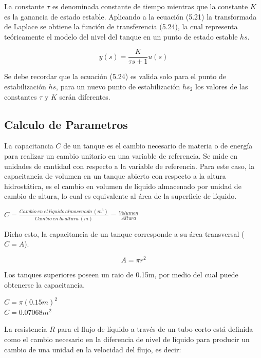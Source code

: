 \documentclass[a4paper,12pt,twoside]{proyectotanquesecci}
\begin{document}
La constante $\tau$ es denominada constante de tiempo mientras que la constante $K$ es la ganancia de estado estable. Aplicando a la ecuación (5.21) la transformada de Laplace se obtiene la función de transferencia (5.24), la cual representa teóricamente el modelo del nivel del tanque en un punto de estado estable $hs$.

\begin{equation}
y(s)=\frac{K}{\tau s+1}u(s)
\end{equation}

Se debe recordar que la ecuación (5.24) es valida solo para el punto de estabilización $hs$, para un nuevo punto de estabilización $hs_{2}$ los valores de las constantes $\tau$ y $K$ serán diferentes. \\




\subsection{Calculo de Parametros}

La capacitancia $C$ de un tanque es el cambio necesario de materia o de energía para realizar un cambio unitario en una variable de referencia. Se mide en unidades de cantidad con respecto a la variable de referencia. Para este caso, la capacitancia de volumen en un tanque abierto con respecto a la altura hidrostática, es el cambio en volumen de líquido almacenado por unidad de cambio de altura, lo cual es equivalente al área de la superficie de líquido.

\begin{center}
$C=\frac{Cambio\ en\ el\ liquido\ almacenado\ (m^{3})}{Cambio\ en\ la\ altura\ (m)}=\frac{Volumen}{Altura}$
\end{center}

Dicho esto, la capacitancia de un tanque corresponde a su área transversal ($C=A$).

\begin{equation}
A=\pi r^{2}
\end{equation}

Los tanques superiores poseen un raio de 0.15m, por medio del cual puede obtenerse la capacitancia.

\begin{center}
$C=\pi (0.15m)^{2}$ \\
$C=0.07068 m^{2}$
\end{center}

La resistencia $R$ para el flujo de líquido a través de un tubo corto está definida como el cambio necesario en la diferencia de nivel de líquido para producir un cambio de una unidad en la velocidad del flujo, es decir:
\end{document}
